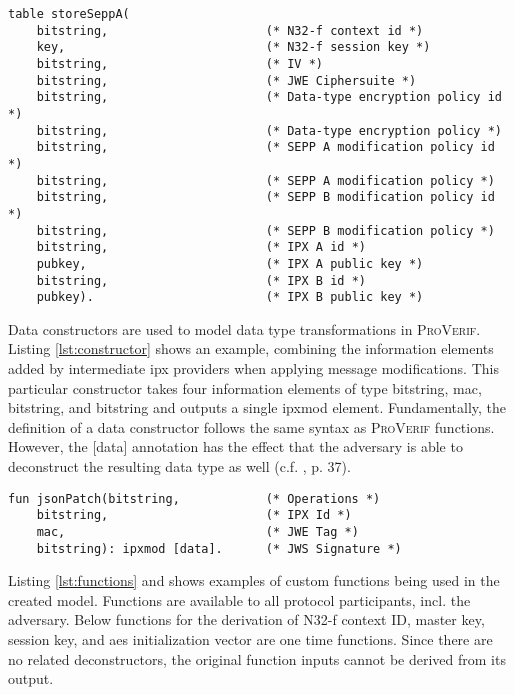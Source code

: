 \begin{lstlisting}[caption={Declaration of local SEPP storage using tables},label={lst:tables},firstnumber=23]
table storeSeppA(
    bitstring,                      (* N32-f context id *)
    key,                            (* N32-f session key *)
    bitstring,                      (* IV *)
    bitstring,                      (* JWE Ciphersuite *)
    bitstring,                      (* Data-type encryption policy id *)
    bitstring,                      (* Data-type encryption policy *)
    bitstring,                      (* SEPP A modification policy id *)
    bitstring,                      (* SEPP A modification policy *)
    bitstring,                      (* SEPP B modification policy id *)
    bitstring,                      (* SEPP B modification policy *)
    bitstring,                      (* IPX A id *)
    pubkey,                         (* IPX A public key *)
    bitstring,                      (* IPX B id *)
    pubkey).                        (* IPX B public key *)
\end{lstlisting}

Data constructors are used to model data type transformations in \textsc{ProVerif}.
Listing \ref{lst:constructor} shows an example, combining the information elements added by intermediate \gls{ipx} providers when applying message modifications.
This particular constructor takes four information elements of type bitstring, mac, bitstring, and bitstring and outputs a single ipxmod element.
Fundamentally, the definition of a data constructor follows the same syntax as \textsc{ProVerif} functions.
However, the [data] annotation has the effect that the adversary is able to deconstruct the resulting data type as well (c.f. \cite{blanchet2020proverif}, p. 37).

\begin{lstlisting}[caption={Definition of custom data constructor},label={lst:constructor},firstnumber=59]
fun jsonPatch(bitstring,            (* Operations *)
    bitstring,                      (* IPX Id *)
    mac,                            (* JWE Tag *)
    bitstring): ipxmod [data].      (* JWS Signature *)
\end{lstlisting}

Listing \ref{lst:functions} and shows examples of custom functions being used in the created model.
Functions are available to all protocol participants, incl. the adversary.
Below functions for the derivation of N32-f context ID, master key, session key, and \gls{aes} initialization vector are one time functions.
Since there are no related deconstructors, the original function inputs cannot be derived from its output.


